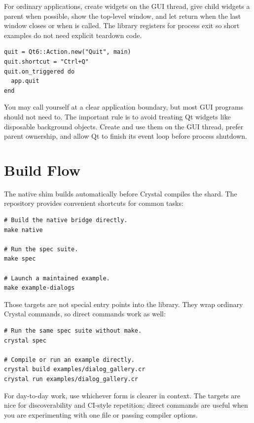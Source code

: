 For ordinary applications, create widgets on the GUI thread, give child widgets a parent when possible, show the top-level window, and let  return when the last window closes or when  is called. The  library registers  for process exit so short examples do not need explicit teardown code.

\begin{lstlisting}[style=crystal]
quit = Qt6::Action.new("Quit", main)
quit.shortcut = "Ctrl+Q"
quit.on_triggered do
  app.quit
end
\end{lstlisting}

You may call  yourself at a clear application boundary, but most GUI programs should not need to. The important rule is to avoid treating Qt widgets like disposable background objects. Create and use them on the GUI thread, prefer parent ownership, and allow Qt to finish its event loop before process shutdown.

\section{Build Flow}

The native shim builds automatically before Crystal compiles the shard. The repository  provides convenient shortcuts for common tasks:

\begin{lstlisting}[style=crystal]
# Build the native bridge directly.
make native

# Run the spec suite.
make spec

# Launch a maintained example.
make example-dialogs
\end{lstlisting}

Those targets are not special entry points into the library. They wrap ordinary Crystal commands, so direct commands work as well:

\begin{lstlisting}[style=crystal]
# Run the same spec suite without make.
crystal spec

# Compile or run an example directly.
crystal build examples/dialog_gallery.cr
crystal run examples/dialog_gallery.cr
\end{lstlisting}

For day-to-day work, use whichever form is clearer in context. The  targets are nice for discoverability and CI-style repetition; direct  commands are useful when you are experimenting with one file or passing compiler options.

